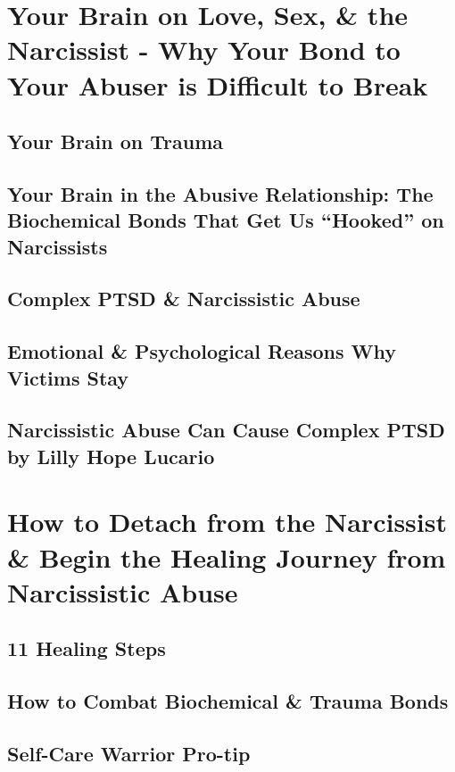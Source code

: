 \documentclass[oneside]{book}
\numberwithin{equation}{section}
\begin{document}
\section{Your Brain on Love, Sex, \& the Narcissist - Why Your Bond to Your Abuser is Difficult to Break}

\subsection{Your Brain on Trauma}

\subsection{Your Brain in the Abusive Relationship: The Biochemical Bonds That Get Us ``Hooked'' on Narcissists}

\subsection{Complex PTSD \& Narcissistic Abuse}

\subsection{Emotional \& Psychological Reasons Why Victims Stay}

\subsection{Narcissistic Abuse Can Cause Complex PTSD by Lilly Hope Lucario}

\section{How to Detach from the Narcissist \& Begin the Healing Journey from Narcissistic Abuse}

\subsection{11 Healing Steps}

\subsection{How to Combat Biochemical \& Trauma Bonds}

\subsection{Self-Care Warrior Pro-tip}
\end{document}
